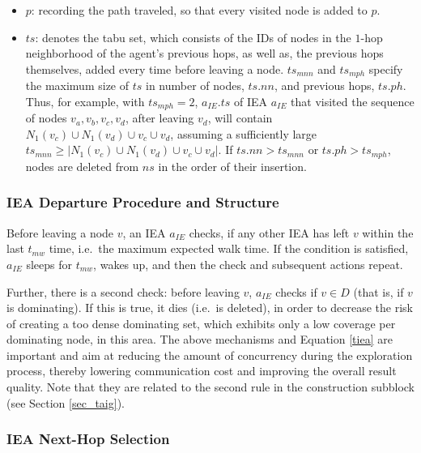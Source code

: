 \begin{itemize}

\item $p$: recording the path traveled, so that every visited node is added to $p$.

\item $ts$: denotes the tabu set, which consists of the IDs of nodes in the $1$-hop neighborhood of the agent's previous hops, as well as, the previous hops themselves, added every time before leaving a node. $ts_{mnn}$ and $ts_{mph}$ specify the maximum size of $ts$ in number of nodes, $ts.nn$, and previous hops, $ts.ph$. Thus, for example, with $ts_{mph}=2$, $a_{IE}.ts$ of IEA $a_{IE}$ that visited the sequence of nodes $v_a, v_b, v_c, v_d$, after leaving $v_d$, will contain $N_1(v_c) \cup N_1(v_d) \cup v_c \cup v_d$, assuming a sufficiently large $ts_{mnn}\geq |N_1(v_c) \cup N_1(v_d) \cup v_c \cup v_d|$. If $ts.nn > ts_{mnn}$ or  $ts.ph > ts_{mph}$, nodes are deleted from $ns$ in the order of their insertion. 
\end{itemize}


\subsubsection{IEA Departure Procedure and Structure}\label{placedeparture}\label{sec_idp}

Before leaving a node $v$, an IEA $a_{IE}$ checks, if any other IEA has left $v$ within the last $t_{mw}$ time, i.e.\ the maximum expected walk time. If the condition is satisfied, $a_{IE}$ sleeps for $t_{mw}$, wakes up, and then the check and subsequent actions repeat.

 Further, there is a second check: before leaving $v$, $a_{IE}$ checks if $v\in D$ (that is, if $v$ is dominating). If this is true, it dies (i.e.\ is deleted), in order to decrease the risk of creating a too dense dominating set, which exhibits only a low coverage per dominating node, in this area. 
The above mechanisms and Equation \ref{tiea} are important and aim at reducing the amount of concurrency during the exploration process, thereby lowering communication cost and improving the overall result quality. Note that they are related to the second rule in the construction subblock (see Section \ref{sec_taig}).

\subsubsection{IEA Next-Hop Selection}\label{secieanhs}\label{sec_inhs}

